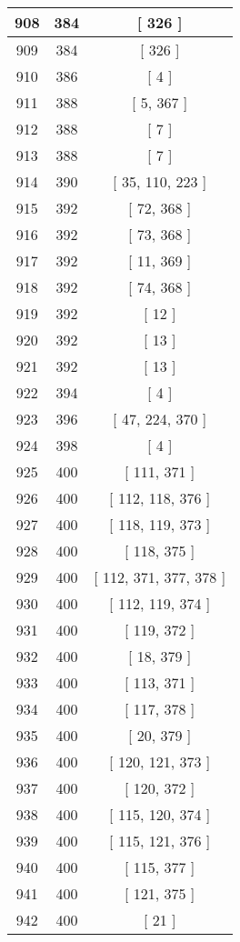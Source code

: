 \begin{center}
\begin{longtable}[H]{|| c c c ||}
908 & 384 & [ 326 ] \\ 
\hline
909 & 384 & [ 326 ] \\ 
\hline
910 & 386 & [ 4 ] \\ 
\hline
911 & 388 & [ 5, 367 ] \\ 
\hline
912 & 388 & [ 7 ] \\ 
\hline
913 & 388 & [ 7 ] \\ 
\hline
914 & 390 & [ 35, 110, 223 ] \\ 
\hline
915 & 392 & [ 72, 368 ] \\ 
\hline
916 & 392 & [ 73, 368 ] \\ 
\hline
917 & 392 & [ 11, 369 ] \\ 
\hline
918 & 392 & [ 74, 368 ] \\ 
\hline
919 & 392 & [ 12 ] \\ 
\hline
920 & 392 & [ 13 ] \\ 
\hline
921 & 392 & [ 13 ] \\ 
\hline
922 & 394 & [ 4 ] \\ 
\hline
923 & 396 & [ 47, 224, 370 ] \\ 
\hline
924 & 398 & [ 4 ] \\ 
\hline
925 & 400 & [ 111, 371 ] \\ 
\hline
926 & 400 & [ 112, 118, 376 ] \\ 
\hline
927 & 400 & [ 118, 119, 373 ] \\ 
\hline
928 & 400 & [ 118, 375 ] \\ 
\hline
929 & 400 & [ 112, 371, 377, 378 ] \\ 
\hline
930 & 400 & [ 112, 119, 374 ] \\ 
\hline
931 & 400 & [ 119, 372 ] \\ 
\hline
932 & 400 & [ 18, 379 ] \\ 
\hline
933 & 400 & [ 113, 371 ] \\ 
\hline
934 & 400 & [ 117, 378 ] \\ 
\hline
935 & 400 & [ 20, 379 ] \\ 
\hline
936 & 400 & [ 120, 121, 373 ] \\ 
\hline
937 & 400 & [ 120, 372 ] \\ 
\hline
938 & 400 & [ 115, 120, 374 ] \\ 
\hline
939 & 400 & [ 115, 121, 376 ] \\ 
\hline
940 & 400 & [ 115, 377 ] \\ 
\hline
941 & 400 & [ 121, 375 ] \\ 
\hline
942 & 400 & [ 21 ] \\ 

\end{longtable}
\end{center}
